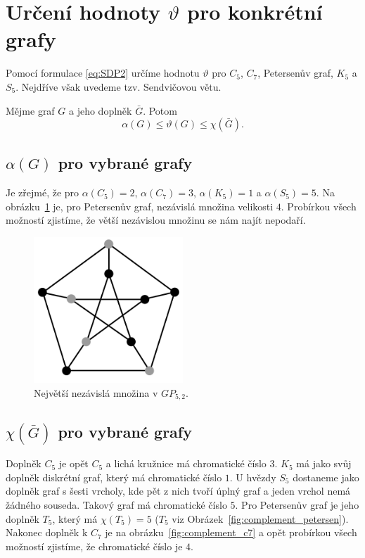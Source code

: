 \section{Určení hodnoty $\vartheta$ pro konkrétní grafy}

Pomocí formulace \ref{eq:SDP2} určíme hodnotu $\vartheta$ pro $C_5$, $C_7$, Petersenův graf, $K_5$ a $S_5$. Nejdříve však uvedeme tzv. Sendvičovou větu.

\begin{vt}
    Mějme graf $G$ a jeho doplněk $\bar{G}$. Potom
    $$
        \alpha(G) \leq \vartheta(G) \leq \chi(\bar{G}).
    $$
\end{vt}

\subsection*{$\alpha(G)$ pro vybrané grafy}
Je zřejmé, že pro $\alpha(C_5) = 2$, $\alpha(C_7) = 3$, $\alpha(K_5) = 1$ a $\alpha(S_5) = 5$. Na obrázku~\ref{fig:alpha_petersen} je, pro Petersenův graf, nezávislá množina velikosti $4$. Probírkou všech možností zjistíme, že větší nezávislou množinu se nám najít nepodaří.

\begin{figure}[h!]
    \centering
    \includegraphics[width=0.5\textwidth]{img/alpha_petersen.jpeg}   
    \caption{Největší nezávislá množina v $GP_{5,2}$.}
    \label{fig:alpha_petersen}
\end{figure}

\subsection*{$\chi(\bar{G})$ pro vybrané grafy}

Doplněk $C_5$ je opět $C_5$ a lichá kružnice má chromatické číslo $3$. $K_5$ má jako svůj doplněk diskrétní graf, který má chromatické číslo $1$. U hvězdy $S_5$ dostaneme jako doplněk graf s šesti vrcholy, kde pět z nich tvoří úplný graf a jeden vrchol nemá žádného souseda. Takový graf má chromatické číslo $5$. Pro Petersenův graf je jeho doplněk $T_5$, který má $\chi(T_5) = 5$ ($T_5$ viz Obrázek~\ref{fig:complement_petersen}). Nakonec doplněk k $C_7$ je na obrázku~\ref{fig:complement_c7} a opět probírkou všech možností zjistíme, že chromatické číslo je $4$.

